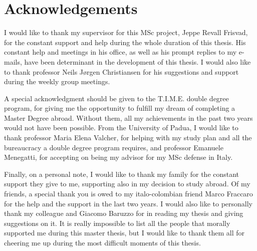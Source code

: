 \chapter{Acknowledgements}
I would like to thank my supervisor for this MSc project, Jeppe Revall Frisvad, for the constant support and help during the whole duration of this thesis. His constant help and meetings in his office, as well as his prompt replies to my e-mails, have been determinant in the development of this thesis. I would also like to thank professor Neils J\o rgen Christiansen for his suggestions and support during the weekly group meetings.

A special acknowledgment should be given to the T.I.M.E. double degree program, for giving me the opportunity to fulfill my dream of completing a Master Degree abroad. Without them, all my achievements in the past two years would not have been possible. From the University of Padua, I would like to thank professor Maria Elena Valcher, for helping with my study plan and all the bureaucracy a double degree program requires, and professor Emanuele Menegatti, for accepting on being my advisor for my MSc defense in Italy.

Finally, on a personal note, I would like to thank my family for the constant support they give to me, supporting also in my decision to study abroad. Of my friends, a special thank you is owed to my italo-colombian friend Marco Fraccaro for the help and the support in the last two years. I would also like to personally thank my colleague and Giacomo Baruzzo for in reading my thesis and giving suggestions on it. It is really impossible to list all the people that morally supported me during this master thesis, but I would like to thank them all for cheering me up during the most difficult moments of this thesis.    